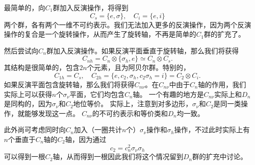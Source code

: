 最简单的，向$C_1$群加入反演操作，将得到
\begin{equation}
    C_s = \{e, \sigma \}, \quad C_i = \{e, i \}
\end{equation}
两个群，各有两个一维不可约表示。我们无法加入更多的反演操作，因为两个反演操作的复合是一个旋转操作，从而产生了旋转轴，不再是简单的$C_1$群的扩充了。

然后尝试向$C_n$群加入反演操作。如果反演平面垂直于旋转轴，那么我们将获得
\begin{equation}
    C_{nh} = C_n \otimes \{\sigma_h, e\} \simeq C_n \otimes C_s.
\end{equation}
其结构是很简单的，包含$2n$个元素，且为阿贝尔群。特别的，
\begin{equation}
    C_{1h} = C_s, \quad C_{2h} = \{e, c_2, \sigma_h, c_2 \sigma_h = i\} = C_2 \otimes C_i.
\end{equation}
如果反演平面包含旋转轴，那么我们将获得$C_{n \nu}$。在$C_{n \nu}$中由于$C_n$轴的作用，我们实际上可以获得$n$个$\sigma_\nu$平面，它们均包含$C_n$轴。
一个有趣的地方是$C_{n \nu}$实际上和$D_n$是同构的，因为$\sigma_\nu$和$C_2$地位等价。
实际上，注意到对多边形，$\sigma_\nu$和$C_2$是同一类操作，就能够发现这一点。
$C_{n \nu}$的不可约表示和等价类和$D_n$均一致。

此外尚可考虑同时向$C_n$加入（一圈共计$n$个）$\sigma_\nu$操作和$\sigma_h$操作，不过此时实际上有$n$个垂直于$C_n$轴的$C_2$轴，因为通过
\[
    c_2 = c_n^2 \sigma_\nu \sigma_h
\]
可以得到一根$C_2$轴，从而得到一根因此我们将这个情况留到$D_n$群的扩充中讨论。


